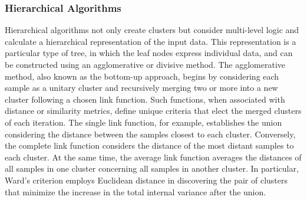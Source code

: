 \documentclass{ieeeaccess}
\begin{document}

\subsubsection{Hierarchical Algorithms}
\label{subsubsec:hierarquico}

Hierarchical algorithms not only create clusters but consider multi-level logic and calculate a hierarchical representation of the input data. This representation is a particular type of tree, in which the leaf nodes express individual data, and can be constructed using an agglomerative or divisive method. The agglomerative method, also known as the bottom-up approach, begins by considering each sample as a unitary cluster and recursively merging two or more into a new cluster following a chosen link function. Such functions, when associated with distance or similarity metrics, define unique criteria that elect the merged clusters of each iteration. The single link function, for example, establishes the union considering the distance between the samples closest to each cluster. Conversely, the complete link function considers the distance of the most distant samples to each cluster. At the same time, the average link function averages the distances of all samples in one cluster concerning all samples in another cluster. In particular, Ward's criterion employs Euclidean distance in discovering the pair of clusters that minimize the increase in the total internal variance after the union.
\end{document}
